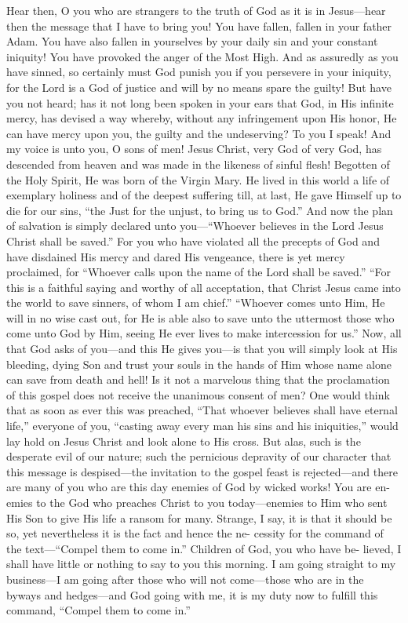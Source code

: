 \documentclass[
]{book}
\begin{document}
Hear then, O you who are strangers to the truth of God as it is in Jesus---hear then the message that I have to bring you! You have fallen, fallen in your father Adam. You have also fallen in yourselves by your daily sin and your constant iniquity! You have provoked the anger of the Most High. And as assuredly as you have sinned, so certainly must God punish you if you persevere in your iniquity, for the Lord is a God of justice and will by no means spare the guilty! But have you not heard; has it not long been spoken in your ears that God, in His infinite mercy, has devised a way whereby, without any infringement upon His honor, He can have mercy upon you, the guilty and the undeserving? To you I speak! And my voice is unto you, O sons of men! Jesus Christ, very God of very God, has descended from heaven and was made in the likeness of sinful flesh! Begotten of the Holy Spirit, He was born of the Virgin Mary. He lived in this world a life of exemplary holiness and of the deepest suffering till, at last, He gave Himself up to die for our sins, ``the Just for the unjust, to bring us to God.'' And now the plan of salvation is simply declared unto you---``Whoever believes in the Lord Jesus Christ shall be saved.'' For you who have violated all the precepts of God and have disdained His mercy and dared His vengeance, there is yet mercy proclaimed, for ``Whoever calls upon the name of the Lord shall be saved.'' ``For this is a faithful saying and worthy of all acceptation, that Christ Jesus came into the world to save sinners, of whom I am chief.'' ``Whoever comes unto Him, He will in no wise cast out, for He is able also to save unto the uttermost those who come unto God by Him, seeing He ever lives to make intercession for us.'' Now, all that God asks of you---and this He gives you---is that you will simply look at His bleeding, dying Son and trust your souls in the hands of Him whose name alone can save from death and hell! Is it not a marvelous thing that the proclamation of this gospel does not receive the unanimous consent of men? One would think that as soon as ever this was preached, ``That whoever believes shall have eternal life,'' everyone of you, ``casting away every man his sins and his iniquities,'' would lay hold on Jesus Christ and look alone to His cross. But alas, such is the desperate evil of our nature; such the pernicious depravity of our character that this message is despised---the invitation to the gospel feast is rejected---and there are many of you who are this day enemies of God by wicked works! You are en- emies to the God who preaches Christ to you today---enemies to Him who sent His Son to give His life a ransom for many. Strange, I say, it is that it should be so, yet nevertheless it is the fact and hence the ne- cessity for the command of the text---``Compel them to come in.'' Children of God, you who have be- lieved, I shall have little or nothing to say to you this morning. I am going straight to my business---I am going after those who will not come---those who are in the byways and hedges---and God going with me, it is my duty now to fulfill this command, ``Compel them to come in.''
\end{document}
